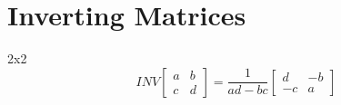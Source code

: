 \documentclass{../templates/mathtool}
\begin{document}
\chapter{Inverting Matrices}

\begin{section}{2x2}
	\[ INV
		\begin{bmatrix}
			a & b \\
			c & d
		\end{bmatrix}
		=
		\frac{1}{ad-bc}
		\begin{bmatrix}
			d & -b \\
			-c & a
		\end{bmatrix}
	\]
\end{section}
\end{document}
